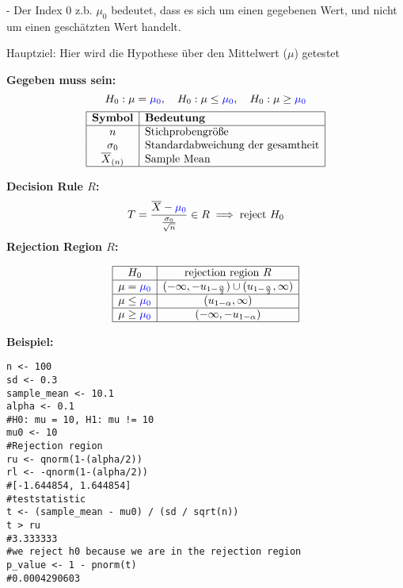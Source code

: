 \begin{multicols*}{2}
\raggedcolumns
- Der Index 0 z.b. $\mu_0$ bedeutet, dass es sich um einen gegebenen Wert, und nicht um einen geschätzten Wert handelt.

\begin{center}

Hauptziel: Hier wird die Hypothese über den
Mittelwert ($\mu$) getestet
\end{center}
\begin{center}
\end{center}


\large{\textbf{Gegeben muss sein:}}
\[
H_0: \mu = \textcolor{blue}{\mu_0}, \quad H_0: \mu \leq \textcolor{blue}{\mu_0}, \quad H_0: \mu \geq \textcolor{blue}{\mu_0}
\]
\[
\begin{array}{|c|l|}
\hline
\textbf{Symbol} & \textbf{Bedeutung} \\
\hline
n & \text{Stichprobengröße} \\
\sigma_0 & \text{Standardabweichung der gesamtheit} \\
\overline{X}_{(n)} & \text{Sample Mean} \\
\hline
\end{array}
\]

\normalsize
\begin{comment}
\large{\textbf{Teststatistik:}}
\[
T = \frac{\overline{X}_{(n)} - \textcolor{blue}{\mu}}{\frac{\sigma_0}{\sqrt{n}}} \sim N(0,1)
\]
\end{comment}
\large{\textbf{Decision Rule  \(R\):}}
\[
T = \frac{\overline{X} - \textcolor{blue}{\mu_0}}{\frac{\sigma_0}{\sqrt{n}}} \in R \implies \text{reject } H_0
\]
\large{\textbf{Rejection Region \(R\):}}

\[
\begin{array}{|c|c|}
\hline
H_0 & \text{rejection region } R \\ \hline
\mu = \textcolor{blue}{\mu_0} & (-\infty, -u_{1-\frac{\alpha}{2}}) \cup (u_{1-\frac{\alpha}{2}}, \infty) \\ \hline
\mu \leq \textcolor{blue}{\mu_0} & (u_{1-\alpha}, \infty) \\ \hline
\mu \geq \textcolor{blue}{\mu_0} & (-\infty, -u_{1-\alpha}) \\ \hline
\end{array}
\]

\large{\textbf{Beispiel:}}
\begin{lstlisting}
n <- 100
sd <- 0.3
sample_mean <- 10.1
alpha <- 0.1
#H0: mu = 10, H1: mu != 10
mu0 <- 10
#Rejection region
ru <- qnorm(1-(alpha/2))
rl <- -qnorm(1-(alpha/2))
#[-1.644854, 1.644854]
#teststatistic
t <- (sample_mean - mu0) / (sd / sqrt(n))
t > ru
#3.333333
#we reject h0 because we are in the rejection region
p_value <- 1 - pnorm(t)
#0.0004290603
\end{lstlisting}


\end{multicols*}
